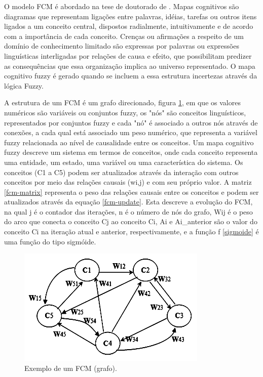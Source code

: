 O modelo FCM é abordado na tese de doutorado de \cite{FCMENDONCA}. Mapas cognitivos são diagramas que representam ligações entre palavras, idéias, tarefas ou outros itens ligados a um conceito central, dispostos radialmente, intuitivamente e de acordo com a importância de cada conceito. Crenças ou afirmações a respeito de um domínio de conhecimento limitado são expressas por palavras ou expressões linguísticas interligadas por relações de causa e efeito, que possibilitam predizer as consequências que essa organização implica ao universo representado. O mapa cognitivo fuzzy é gerado quando se incluem a essa estrutura incertezas através da lógica Fuzzy.

A estrutura de um FCM é um grafo direcionado, figura \ref{fig:fcm}, em que os valores numéricos são variáveis ou conjuntos fuzzy, os "nós" são conceitos linguísticos, representados por conjuntos fuzzy e cada "nó" é associado a outros nós através de conexões, a cada qual está associado um peso numérico, que representa a variável fuzzy relacionada ao nível de causalidade entre os conceitos. Um mapa cognitivo fuzzy descreve um sistema em termos de conceitos, onde cada conceito representa uma entidade, um estado, uma variável ou uma característica do sistema. Os conceitos (C1 a C5) podem ser atualizados através da interação com outros conceitos por meio das relações causais (wi,j) e com seu próprio valor. A matriz \ref{fcm-matrix} representa o peso das relações causais entre os conceitos e podem ser atualizados através da equação \ref{fcm-update}. Esta descreve a evolução do FCM, na qual j é o contador das iterações, n é o número de nós do grafo, Wij é o peso do arco que conecta o conceito Cj ao conceito Ci, Ai e Ai_anterior são o valor do conceito Ci na iteração atual e anterior, respectivamente, e a função f \ref{sigmoide} é uma função do tipo sigmóide.

\begin{figure}[!htb]
    \centering
    \includegraphics{./figs/fcm.png}
    \caption[Mapa Cognitivo Fuzzy]{Exemplo de um FCM (grafo).}
    \label{fig:fcm}
\end{figure}

